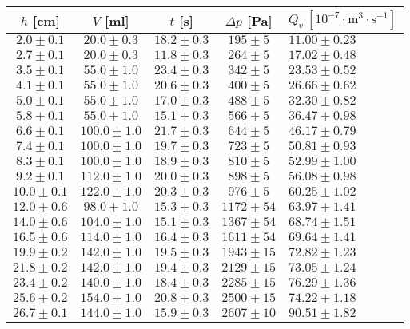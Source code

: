 \documentclass[a4paper]{article}
\begin{document}
\begin{center}
    \label{tab:title}
    \begin{tabular}{ | c | c | c | c |  p{3cm} |} \hline
    $h$ [cm] & $V$ [ml] & $t$ [s]& $\Delta p$ [Pa] & $Q_{v} \: [10^{-7} \cdot \mathrm{m^{3} \cdot s^{-1}}]$   \\ \hline
    $2.0\pm0.1$ & $20.0\pm0.3$ & $18.2\pm0.3$ & $195\pm5$ & $11.00\pm0.23$ \\ \hline
    $2.7\pm0.1$ & $20.0\pm0.3$ & $11.8\pm0.3$ & $264\pm5$ & $17.02\pm0.48$ \\ \hline
    $3.5\pm0.1$ & $55.0\pm1.0$ & $23.4\pm0.3$ & $342\pm5$ & $23.53\pm0.52$ \\ \hline
    $4.1\pm0.1$ & $55.0\pm1.0$ & $20.6\pm0.3$ & $400\pm5$ & $26.66\pm0.62$ \\ \hline
    $5.0\pm0.1$ & $55.0\pm1.0$ & $17.0\pm0.3$ & $488\pm5$ & $32.30\pm0.82$ \\ \hline
    $5.8\pm0.1$ & $55.0\pm1.0$ & $15.1\pm0.3$ & $566\pm5$ & $36.47\pm0.98$ \\ \hline
    $6.6\pm0.1$ & $100.0\pm1.0$ & $21.7\pm0.3$ & $644\pm5$ & $46.17\pm0.79$ \\ \hline
    $7.4\pm0.1$ & $100.0\pm1.0$ & $19.7\pm0.3$ & $723\pm5$ & $50.81\pm0.93$ \\ \hline
    $8.3\pm0.1$ & $100.0\pm1.0$ & $18.9\pm0.3$ & $810\pm5$ & $52.99\pm1.00$ \\ \hline
    $9.2\pm0.1$ & $112.0\pm1.0$ & $20.0\pm0.3$ & $898\pm5$ & $56.08\pm0.98$ \\ \hline
    $10.0\pm0.1$ & $122.0\pm1.0$ & $20.3\pm0.3$ & $976\pm5$ & $60.25\pm1.02$ \\ \hline
    $12.0\pm0.6$ & $98.0\pm1.0$ & $15.3\pm0.3$ & $1172\pm54$ & $63.97\pm1.41$ \\ \hline
    $14.0\pm0.6$ & $104.0\pm1.0$ & $15.1\pm0.3$ & $1367\pm54$ & $68.74\pm1.51$ \\ \hline
    $16.5\pm0.6$ & $114.0\pm1.0$ & $16.4\pm0.3$ & $1611\pm54$ & $69.64\pm1.41$ \\ \hline
    $19.9\pm0.2$ & $142.0\pm1.0$ & $19.5\pm0.3$ & $1943\pm15$ & $72.82\pm1.23$ \\\hline
    $21.8\pm0.2$ & $142.0\pm1.0$ & $19.4\pm0.3$ & $2129\pm15$ & $73.05\pm1.24$ \\ \hline
    $23.4\pm0.2$ & $140.0\pm1.0$ & $18.4\pm0.3$ & $2285\pm15$ & $76.29\pm1.36$ \\ \hline
    $25.6\pm0.2$ & $154.0\pm1.0$ & $20.8\pm0.3$ & $2500\pm15$ & $74.22\pm1.18$ \\ \hline
    $26.7\pm0.1$ & $144.0\pm1.0$ & $15.9\pm0.3$ & $2607\pm10$ & $90.51\pm1.82$ \\ \hline
    \end{tabular}
\end{center}
\end{document}
